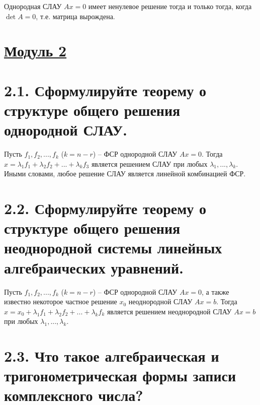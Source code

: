 \documentclass{article}
\begin{document}
Однородная СЛАУ $Ax = 0$ имеет ненулевое решение тогда и только тогда, когда $\det{A} = 0$, т.е. матрица вырождена.

\newpage
{}
\section*{\LARGE\centering \underline{Модуль 2}}

\section*{\LARGE 2.1. Сформулируйте теорему о структуре общего решения однородной СЛАУ.  }

Пусть $f_1, f_2, ..., f_k$ ($k = n - r$) -- ФСР однородной СЛАУ $Ax = 0$. Тогда $x = \lambda_1f_1 + \lambda_2f_2 + ... + \lambda_kf_3$ является решением СЛАУ при любых $\lambda_1, ..., \lambda_k$. Иными словами, любое решение СЛАУ является линейной комбинацией ФСР.

\section*{\LARGE 2.2. Сформулируйте теорему о структуре общего решения неоднородной системы линейных алгебраических уравнений. }

Пусть $f_1, f_2, ..., f_k$ ($k = n - r$) -- ФСР однородной СЛАУ $Ax = 0$, а также известно некоторое частное решение $x_0$ неоднородной СЛАУ $Ax = b$. Тогда $x = x_0 + \lambda_1f_1 + \lambda_2f_2 + ... + \lambda_kf_k$ является решением неоднородной СЛАУ $Ax = b$ при любых $\lambda_1, ..., \lambda_k$.

\section*{\LARGE 2.3. Что такое алгебраическая и тригонометрическая формы записи комплексного числа? }
\end{document}
